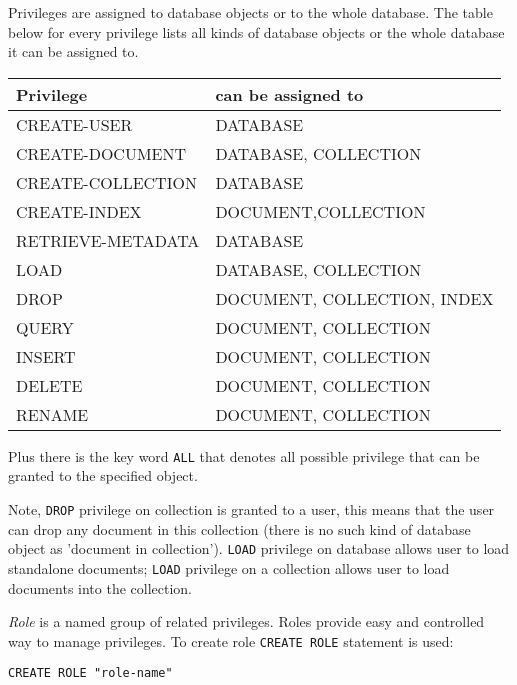 \documentclass[a4paper,12pt]{article}
\begin{document}
Privileges are assigned to database objects or to the whole database. The table below for every privilege lists all kinds of database objects or the whole database it can be assigned to.

\begin{tabular}{|l|l|}
\hline
\hline
Privilege            & can be assigned to             \\
\hline
\hline
CREATE-USER          & DATABASE                       \\
\hline
CREATE-DOCUMENT      & DATABASE, COLLECTION           \\
\hline
CREATE-COLLECTION    & DATABASE                       \\
\hline
CREATE-INDEX         & DOCUMENT,COLLECTION            \\
\hline
RETRIEVE-METADATA    & DATABASE                       \\
\hline
LOAD                 & DATABASE, COLLECTION           \\
\hline
DROP                 & DOCUMENT, COLLECTION, INDEX    \\
\hline
QUERY                & DOCUMENT, COLLECTION           \\
\hline
INSERT               & DOCUMENT, COLLECTION           \\
\hline
DELETE               & DOCUMENT, COLLECTION           \\
\hline
RENAME               & DOCUMENT, COLLECTION           \\
\hline
\end{tabular}

Plus there is the key word \verb!ALL! that denotes all possible privilege that can be granted to the specified object.

Note, \verb!DROP! privilege on collection is granted to a user, this means that the user can drop any document in this collection (there is no such kind of database object as 'document in collection'). \verb!LOAD! privilege on database allows user to load standalone documents; \verb!LOAD! privilege on a collection allows user to load documents into the collection.

\emph{Role} is a named group of related privileges. Roles provide easy and controlled way to manage privileges. To create role \verb!CREATE ROLE! statement is used:

\begin{verbatim}
CREATE ROLE "role-name"
\end{verbatim}
\end{document}

